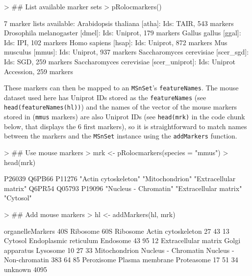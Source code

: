\begin{Schunk}
\begin{Sinput}
> ## List available marker sets
> pRolocmarkers()
\end{Sinput}
\begin{Soutput}
7 marker lists available:
Arabidopsis thaliana [atha]:
 Ids: TAIR, 543 markers
Drosophila melanogaster [dmel]:
 Ids: Uniprot, 179 markers
Gallus gallus [ggal]:
 Ids: IPI, 102 markers
Homo sapiens [hsap]:
 Ids: Uniprot, 872 markers
Mus musculus [mmus]:
 Ids: Uniprot, 937 markers
Saccharomyces cerevisiae [scer_sgd]:
 Ids: SGD, 259 markers
Saccharomyces cerevisiae [scer_uniprot]:
 Ids: Uniprot Accession, 259 markers
\end{Soutput}
\end{Schunk}

These markers can then be mapped to an \texttt{MSnSet}'s
\texttt{featureNames}. The mouse dataset used here has Uniprot IDs
stored as the \texttt{featureNames} (see
\texttt{head(featureNames(hl))}) and the names of the vector of the
mouse markers stored in  (\texttt{mmus} markers) are
also Uniprot IDs (see \texttt{head(mrk)} in the code chunk below, that
displays the 6 first markers), so it is straightforward to match names
between the markers and the \texttt{MSnSet} instance using the
\texttt{addMarkers} function.

\begin{Schunk}
\begin{Sinput}
> ## Use mouse markers
> mrk <- pRolocmarkers(species = "mmus")
> head(mrk)
\end{Sinput}
\begin{Soutput}
                P26039                 Q6PB66                 P11276 
  "Actin cytoskeleton"        "Mitochondrion" "Extracellular matrix" 
                Q6PR54                 Q05793                 P19096 
 "Nucleus - Chromatin" "Extracellular matrix"              "Cytosol" 
\end{Soutput}
\begin{Sinput}
> ## Add mouse markers
> hl <- addMarkers(hl, mrk)
\end{Sinput}
\begin{Soutput}
organelleMarkers
           40S Ribosome            60S Ribosome      Actin cytoskeleton 
                     27                      43                      13 
                Cytosol   Endoplasmic reticulum                Endosome 
                     43                      95                      12 
   Extracellular matrix         Golgi apparatus                Lysosome 
                     10                      27                      33 
          Mitochondrion     Nucleus - Chromatin Nucleus - Non-chromatin 
                    383                      64                      85 
             Peroxisome         Plasma membrane              Proteasome 
                     17                      51                      34 
                unknown 
                   4095 
\end{Soutput}
\end{Schunk}

